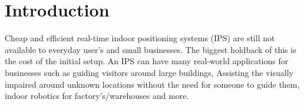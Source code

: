 \section{Introduction }\label{sec:intro}
	Cheap and efficient real-time indoor positioning systems (IPS) are still not available to everyday user’s and small businesses. The biggest holdback of this is the cost of the initial setup. An IPS can have many real-world applications for businesses such as guiding visitors around large buildings, Assisting the visually impaired around unknown locations without the need for someone to guide them, indoor robotics for factory’s/warehouses and more.